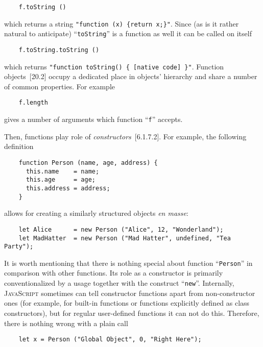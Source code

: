 \documentclass{article}
\newcommand{\js}{\textsc{JavaScript}\xspace}
\newcommand{\rf}[1]{[\textsc{#1}]}
\newcommand{\out}[1]{\texttt{#1}}
\begin{document}
\begin{lstlisting}
    f.toString ()
\end{lstlisting}

which returns a string \out{"function (x) \{return x;\}"}. Since (as is it rather natural to anticipate) ``\lstinline|toString|''
is a function as well it can be called on itself

\begin{lstlisting}
    f.toString.toString ()
\end{lstlisting}

which returns \out{"function toString() \{ [native code] \}"}. Function objects~\rf{20.2} occupy a dedicated place in objects' hierarchy
and share a number of common properties. For example

\begin{lstlisting}
    f.length
\end{lstlisting}

gives a number of arguments which function ``\lstinline|f|'' accepts.

Then, functions play role of \emph{constructors}~\rf{6.1.7.2}. For example, the following definition

\begin{lstlisting}
    function Person (name, age, address) {
      this.name    = name;
      this.age     = age;
      this.address = address;
    }
\end{lstlisting}

allows for creating a similarly structured objects \emph{en masse}:

\begin{lstlisting}
    let Alice      = new Person ("Alice", 12, "Wonderland");
    let MadHatter  = new Person ("Mad Hatter", undefined, "Tea Party");  
\end{lstlisting}

It is worth mentioning that there is nothing special about function ``\lstinline|Person|'' in
comparison with other functions. Its role as a constructor is primarily conventionalized
by a usage together with the construct ``\lstinline|new|''. Internally, \js sometimes can
tell constructor functions apart from non-constructor ones (for example, for built-in functions or
functions explicitly defined as class constructors), but for regular user-defined functions
it can not do this. Therefore, there is nothing wrong with a plain call

\begin{lstlisting}
    let x = Person ("Global Object", 0, "Right Here");
\end{lstlisting}
\end{document}
